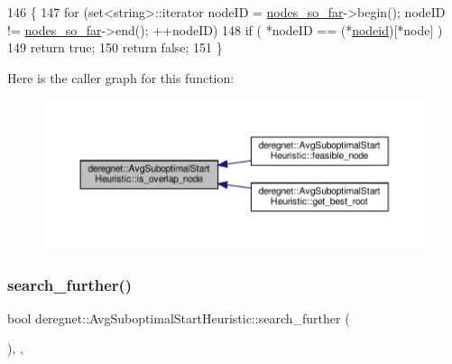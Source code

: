 \begin{DoxyCode}
146                                                             \{
147     \textcolor{keywordflow}{for} (set<string>::iterator nodeID = \hyperlink{classderegnet_1_1AvgSuboptimalStartHeuristic_ac07c2b61bf03b25e1bd87cb353bd4597}{nodes\_so\_far}->begin(); nodeID != 
      \hyperlink{classderegnet_1_1AvgSuboptimalStartHeuristic_ac07c2b61bf03b25e1bd87cb353bd4597}{nodes\_so\_far}->end(); ++nodeID)
148         \textcolor{keywordflow}{if} ( *nodeID == (*\hyperlink{classderegnet_1_1AvgSuboptimalStartHeuristic_af59e6b6ba10fd5d2c210a0947cf37e66}{nodeid})[*node] )
149             \textcolor{keywordflow}{return} \textcolor{keyword}{true};
150     \textcolor{keywordflow}{return} \textcolor{keyword}{false};
151 \}
\end{DoxyCode}
Here is the caller graph for this function\+:\nopagebreak
\begin{figure}[H]
\begin{center}
\leavevmode
\includegraphics[width=350pt]{classderegnet_1_1AvgSuboptimalStartHeuristic_abc4fa54576da31f3037f2c1aa2cd9140_icgraph}
\end{center}
\end{figure}
\mbox{\label{classderegnet_1_1AvgSuboptimalStartHeuristic_a668a9db07c0d29c9b3618487f25fe5f4}} 
\subsubsection{\texorpdfstring{search\+\_\+further()}{search\_further()}}
{\footnotesize\ttfamily bool deregnet\+::\+Avg\+Suboptimal\+Start\+Heuristic\+::search\+\_\+further (\begin{DoxyParamCaption}{ }\end{DoxyParamCaption})\hspace{0.3cm}{\ttfamily [override]}, {\ttfamily [private]}, {\ttfamily [virtual]}}



